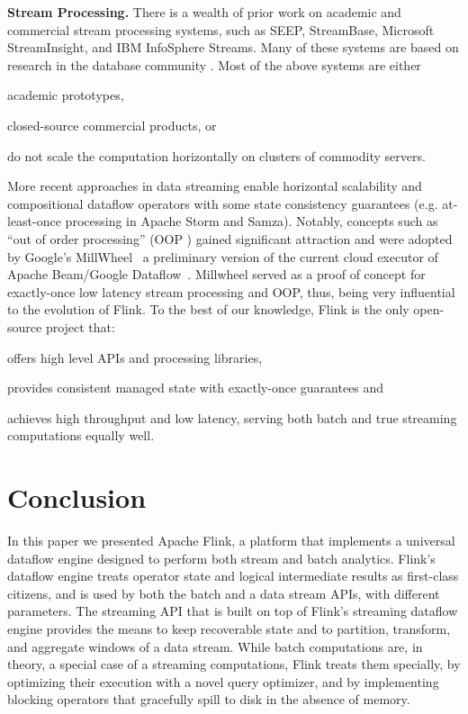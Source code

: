 \documentclass[11pt]{article}
\newcommand{\para}[1]{\vspace{2mm}\noindent\textbf{#1}}
\begin{document}
\para{Stream Processing.} There is a wealth of prior work on academic and commercial stream processing systems, such as SEEP, StreamBase, Microsoft StreamInsight, and IBM InfoSphere Streams. Many of these systems are based on research in the database community \cite{chandrasekaran2003psoup,abadi2005design,arasu2004stream,chandramouli2014trill,gedik2008spade,migliavacca2010seep}. Most of the above systems are either
\begin{inparaenum}[i)]
  \item academic prototypes,
  \item closed-source commercial products, or 
  \item do not scale the computation horizontally on clusters of commodity servers.
\end{inparaenum}
More recent approaches in data streaming enable horizontal scalability and compositional dataflow operators with some state consistency guarantees (e.g. at-least-once processing in Apache Storm and Samza). Notably, concepts such as ``out of order processing'' (OOP \cite{li2008out}) gained significant attraction and were adopted by Google's MillWheel~\cite{akidau2013millwheel} a preliminary version of the current cloud executor of Apache Beam/Google Dataflow~\cite{akidau2015dataflow}. Millwheel served as a proof of concept for exactly-once low latency stream processing and OOP, thus, being very influential to the evolution of Flink. To the best of our knowledge, Flink is the only open-source project that:
\begin{inparaenum}[i)]
  \item offers high level APIs and processing libraries,
  \item provides consistent managed state with exactly-once guarantees and
  \item achieves high throughput and low latency, serving both batch and true streaming computations equally well.
\end{inparaenum}

\vspace{-3mm}
\section{Conclusion}
\label{sec:conclusions}
In this paper we presented Apache Flink, a platform that implements a universal dataflow engine designed to perform both stream and batch analytics. Flink's dataflow engine treats operator state and logical intermediate results as first-class citizens, and is used by both the batch and a data stream APIs, with different parameters. The streaming API that is built on top of  Flink's streaming dataflow engine provides the means to keep recoverable state and to partition, transform, and aggregate windows of a data stream. While batch computations are, in theory, a special case of a streaming computations, Flink treats them specially, by optimizing their execution with a novel query optimizer, and by implementing blocking operators that gracefully spill to disk in the absence of memory. 


{
\small


}
\end{document}
